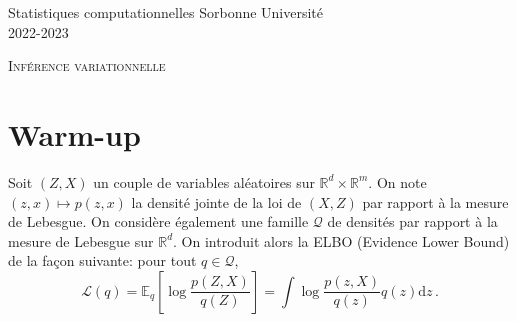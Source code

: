\documentclass[a4paper,10pt,fleqn]{article}
\newcommand{\rset}{\ensuremath{\mathbb{R}}}
\newcommand{\1}{\ensuremath{\mathbbm{1}}}
\begin{document}
\noindent Statistiques computationnelles \hfill Sorbonne Universit\'e \\
 2022-2023

\noindent\hrulefill

\begin{center}
\textsc{Inf\'erence variationnelle}
\end{center}
\hrulefill

\medskip


\section{Warm-up}
Soit $(Z,X)$ un couple de variables al\'eatoires sur $\rset^d\times \rset^m$. On note $(z,x)\mapsto p(z,x)$ la densit\'e jointe de la loi de $(X,Z)$ par rapport \`a la mesure de Lebesgue. On consid\`ere \'egalement une famille $\mathcal{Q}$ de densit\'es par rapport \`a la mesure de Lebesgue sur $\rset^d$. On introduit alors la ELBO (Evidence Lower Bound) de la fa\c con suivante: pour tout $q\in\mathcal{Q}$,
$$
\mathcal{L}(q) = \mathbb{E}_q\left[\log\frac{p(Z,X)}{q(Z)}\right] = \int \log\frac{p(z,X)}{q(z)}q(z) \mathrm{d} z\,.
$$
\end{document}
